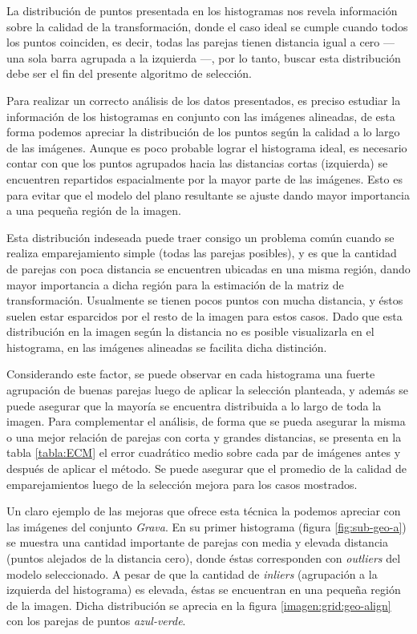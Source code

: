 La distribución de puntos presentada en los histogramas nos revela información sobre la calidad de la transformación, donde el caso ideal se cumple cuando todos los puntos coinciden, es decir, todas las parejas tienen distancia igual a cero --- una sola barra agrupada a la izquierda ---, por lo tanto, buscar esta distribución debe ser el fin del presente algoritmo de selección. 

Para realizar un correcto análisis de los datos presentados, es preciso estudiar la información de los histogramas en conjunto con las imágenes alineadas, de esta forma podemos apreciar la distribución de los puntos según la calidad a lo largo de las imágenes. Aunque es poco probable lograr el histograma ideal, es necesario contar con que los puntos agrupados hacia las distancias cortas (izquierda) se encuentren repartidos espacialmente por la mayor parte de las imágenes. Esto es para evitar que el modelo del plano resultante se ajuste dando mayor importancia a una pequeña región de la imagen.

Esta distribución indeseada puede traer consigo un problema común cuando se realiza emparejamiento simple (todas las parejas posibles), y es que la cantidad de parejas con poca distancia se encuentren ubicadas en una misma región, dando mayor importancia a dicha región para la estimación de la matriz de transformación. Usualmente se tienen pocos puntos con mucha distancia, y éstos suelen estar esparcidos por el resto de la imagen para estos casos. Dado que esta distribución en la imagen según la distancia no es posible visualizarla en el histograma, en las imágenes alineadas se facilita dicha distinción.

Considerando este factor, se puede observar en cada histograma una fuerte agrupación de buenas parejas luego de aplicar la selección planteada, y además se puede asegurar que la mayoría se encuentra distribuida a lo largo de toda la imagen. Para complementar el análisis, de forma que se pueda asegurar la misma o una mejor relación de parejas con corta y grandes distancias, se presenta en la tabla \ref{tabla:ECM} el error cuadrático medio sobre cada par de imágenes antes y después de aplicar el método. Se puede asegurar que el promedio de la calidad de emparejamientos luego de la selección mejora para los casos mostrados.

Un claro ejemplo de las mejoras que ofrece esta técnica la podemos apreciar con las imágenes del conjunto \textit{Grava}. En su primer histograma (figura \ref{fig:sub-geo-a}) se muestra una cantidad importante de parejas con media y elevada distancia (puntos alejados de la distancia cero), donde éstas corresponden con \textit{outliers} del modelo seleccionado. A pesar de que la cantidad  de \textit{inliers} (agrupación a la izquierda del histograma) es elevada, éstas se encuentran en una pequeña región de la imagen. Dicha distribución se aprecia en la figura \ref{imagen:grid:geo-align} con los parejas de puntos \textit{azul-verde}. 

